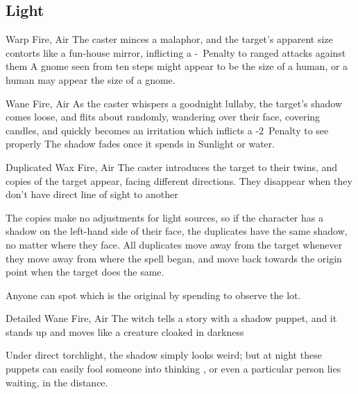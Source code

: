 \begin{multicols}{2}

\subsection{Light}
\label{lightSpells}

  {}%
  {Warp}%
  {Fire, Air}%
  {}%
  {The caster minces a malaphor, and the target's apparent size contorts like a fun-house mirror, inflicting a -~Penalty to ranged attacks against them}%
  {A gnome seen from ten steps might appear to be the size of a human, or a human may appear the size of a gnome.}



  {}%
  {Wane}%
  {Fire, Air}%
  {}%
  {As the caster whispers a goodnight lullaby, the target's shadow comes loose, and flits about randomly, wandering over their face, covering candles, and quickly becomes an irritation which inflicts a -2~Penalty to see properly}%
  {The shadow fades once it spends  in Sunlight or water.}


  {Duplicated}%
  {Wax}%
  {Fire, Air}%
  {}%
  {The caster introduces the target to their twins, and  copies of the target appear, facing different directions.  They disappear when they don't have direct line of sight to another}%
  {The copies make no adjustments for light sources, so if the character has a shadow on the left-hand side of their face, the duplicates have the same shadow, no matter where they face.
  All duplicates move away from the target whenever they move away from where the \gls{spell} began, and move back towards the origin point when the target does the same.

  Anyone can spot which is the original by spending  to observe the lot.}




  {Detailed}%
  {Wane}%
  {Fire, Air}%
  {}%
  {The \gls{witch} tells a story with a shadow puppet, and it stands up and moves like a creature cloaked in darkness}%
  {Under direct torchlight, the shadow simply looks weird; but at night these puppets can easily fool someone into thinking , or even a particular person lies waiting, in the distance.

}
\end{multicols}
